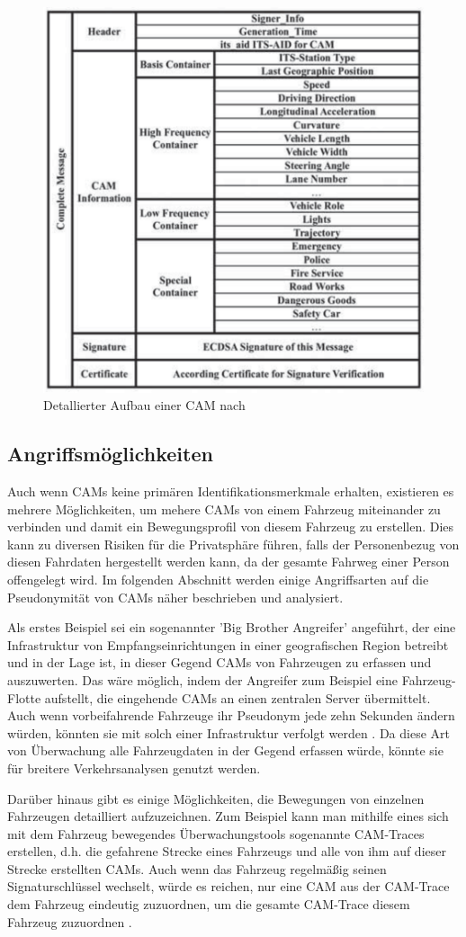 \begin{figure}
	\centering
	\includegraphics[width=0.4\linewidth]{images/CAM}
	\caption{Detallierter Aufbau einer CAM nach \cite{Kiometzis2017}}
	\label{fig:cam}
\end{figure}

\subsection{Angriffsmöglichkeiten}
\label{sec:FirstContentSection:ThirdSubSection}

Auch wenn CAMs keine primären Identifikationsmerkmale erhalten, existieren es mehrere Möglichkeiten, um mehere CAMs von einem Fahrzeug miteinander zu verbinden und damit ein Bewegungsprofil von diesem Fahrzeug zu erstellen. Dies kann zu diversen Risiken für die Privatsphäre führen, falls der Personenbezug von diesen Fahrdaten hergestellt werden kann, da der gesamte Fahrweg einer Person offengelegt wird. Im folgenden Abschnitt werden einige Angriffsarten auf die Pseudonymität von CAMs näher beschrieben und analysiert. 

Als erstes Beispiel sei ein sogenannter 'Big Brother Angreifer' angeführt, der eine Infrastruktur von Empfangseinrichtungen in einer geografischen Region betreibt und in der Lage ist, in dieser Gegend CAMs von Fahrzeugen zu erfassen und auszuwerten. Das wäre möglich, indem der Angreifer zum Beispiel eine Fahrzeug-Flotte aufstellt, die eingehende CAMs an einen zentralen Server übermittelt. Auch wenn vorbeifahrende Fahrzeuge ihr Pseudonym jede zehn Sekunden ändern würden, könnten sie mit solch einer Infrastruktur verfolgt werden \cite{Wiedersheim2010}. Da diese Art von Überwachung alle Fahrzeugdaten in der Gegend erfassen würde, könnte sie für breitere Verkehrsanalysen genutzt werden.
 
Darüber hinaus gibt es einige Möglichkeiten, die Bewegungen von einzelnen Fahrzeugen detailliert aufzuzeichnen. Zum Beispiel kann man mithilfe eines sich mit dem Fahrzeug bewegendes Überwachungstools sogenannte CAM-Traces erstellen, d.h. die gefahrene Strecke eines Fahrzeugs und alle von ihm auf dieser Strecke erstellten CAMs. Auch wenn das Fahrzeug regelmäßig seinen Signaturschlüssel wechselt, würde es reichen, nur eine CAM aus der CAM-Trace dem Fahrzeug eindeutig zuzuordnen, um die gesamte CAM-Trace diesem Fahrzeug zuzuordnen \cite{Kiometzis2017}. 

